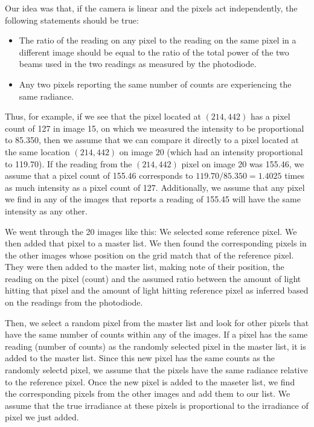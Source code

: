 Our idea was that, if the camera is linear and the pixels act independently, the following statements should be true: 
\begin{itemize}
\item The ratio of the reading on any pixel to the reading on the same pixel in a different image should be equal to the ratio of the total power of the two beams used in the two readings as measured by the photodiode. 
\item Any two pixels reporting the same number of counts are experiencing the same radiance.
\end{itemize}

Thus, for example, if we see that the pixel located at $(214,442)$ has a pixel count of 127 in image 15, on which we measured the intensity to be proportional to 85.350, then we assume that we can compare it directly to a pixel located at the same location $(214,442)$ on image 20 (which had an intensity proportional to 119.70). If the reading from the $(214,442)$ pixel on image 20 was 155.46, we assume that a pixel count of 155.46 corresponds to $119.70/85.350=1.4025$ times as much intensity as a pixel count of 127. Additionally, we assume that any pixel we find in any of the images that reports a reading of 155.45 will have the same intensity as any other. 

We went through the 20 images like this: We selected some reference pixel. We then added that pixel to a master list. We then found the corresponding pixels in the other images whose position on the grid match that of the reference pixel. They were then added to the master list, making note of their position, the reading on the pixel (count) and the assumed ratio between the amount of light hitting that pixel and the amount of light hitting reference pixel as inferred based on the readings from the photodiode.

Then, we select a random pixel from the master list and look for other pixels that have the same number of counts within any of the images. If a pixel has the same reading (number of counts) as the randomly selected pixel in the master list, it is added to the master list. Since this new pixel has the same counts as the randomly selectd pixel, we assume that the pixels have the same radiance relative to the reference pixel. Once the new pixel is added to the maseter list, we find the corresponding pixels from the other images and add them to our list. We assume that the true irradiance at these pixels is proportional to the irradiance of pixel we just added. 

